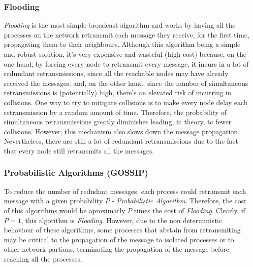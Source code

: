 \documentclass[conference]{IEEEtran}
\begin{document}
\subsubsection{Flooding}
\emph{Flooding} \cite{broadcaststorm} is the most simple broadcast algorithm and works by having all the processes on the network retransmit each message they receive, for the first time, propagating them to their neighbours. Although this algorithm being a simple and robust solution, it's very expensive and wasteful (high cost) because, on the one hand, by forcing every node to retransmit every message, it incurs in a lot of redundant retransmissions, since all the reachable nodes may have already received the messages, and, on the other hand, since the number of simultaneous retransmissions is (potentially) high, there's an elevated risk of incurring in collisions.
%
One way to try to mitigate collisions is to make every node delay each retransmission by a random amount of time. Therefore, the probability of simultaneous retransmissions greatly diminishes leading, in theory, to fewer collisions.
However, this mechanism also slows down the message propagation.
Nevertheless, there are still a lot of redundant retransmissions due to the fact that every node still retransmits all the messages.

\subsubsection{Probabilistic Algorithms (GOSSIP)}
To reduce the number of redudant messages, each process could retransmit each message with a given probability $P$ - \emph{Probabilistic Algorithm}\cite{broadcaststorm,probabilistic2,probabilistic1,gossip,probabilistic3}. 
Therefore, the cost of this algorithms would be aproximatly $P$ times the cost of \emph{Flooding}.
Clearly, if $P=1$, this algorithm is \emph{Flooding}.
However, due to the non deterministic behaviour of these algorithms, some processes that abstain from retransmiting may be critical to the propagation of the message to isolated processes or to other network partions, terminating the propagation of the message before reaching all the processes.

\end{document}

